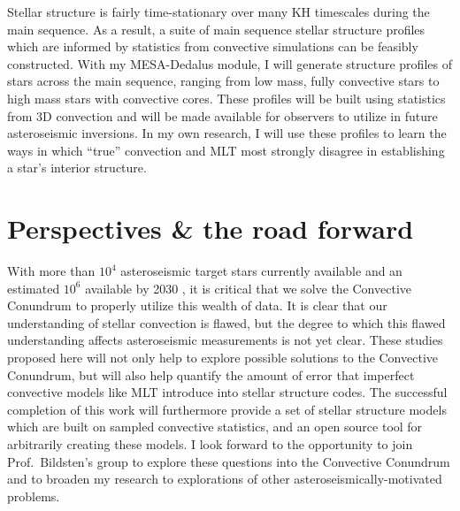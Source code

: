 \documentclass[preprint, hmargin=1in, vmargin=1in]{aastex62}
\begin{document}
Stellar structure is fairly time-stationary over many KH timescales during the main sequence.
As a result, a suite of main sequence stellar structure profiles which are informed by statistics from convective simulations can be feasibly constructed.
With my MESA-Dedalus module, I will generate structure profiles of stars across the main sequence, ranging from low mass, fully convective stars to high mass stars with convective cores.
These profiles will be built using statistics from 3D convection and will be made available for observers to utilize in future asteroseismic inversions.
In my own research, I will use these profiles to learn the ways in which ``true'' convection and MLT most strongly disagree in establishing a star's interior structure.

\section*{\textbf{Perspectives \& the road forward}}
With more than $10^4$ asteroseismic target stars currently available and an estimated $10^6$ available by 2030 \citep{huber&all2019}, it is critical that we solve the Convective Conundrum to properly utilize this wealth of data.
It is clear that our understanding of stellar convection is flawed, but the degree to which this flawed understanding affects asteroseismic measurements is not yet clear.
These studies proposed here will not only help to explore possible solutions to the Convective Conundrum, but will also help quantify the amount of error that imperfect convective models like MLT introduce into stellar structure codes.
The successful completion of this work will furthermore provide a set of stellar structure models which are built on sampled convective statistics, and an open source tool for arbitrarily creating these models.
I look forward to the opportunity to join Prof.~Bildsten's group to explore these questions into the Convective Conundrum and to broaden my research to explorations of other asteroseismically-motivated problems.



\end{document}
